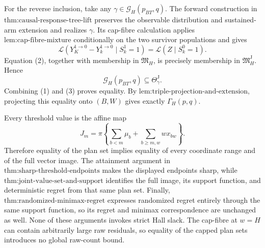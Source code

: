 For the reverse inclusion, take any \(\gamma\in\mathcal G_H(p_{BT},q)\). The forward construction in \(\text{thm:causal-response-tree-lift}\) preserves the observable distribution and sustained-arm extension and realizes \(\gamma\). Its cap-fibre calculation applies \(\text{lem:cap-fibre-mixture}\) conditionally on the two survivor populations and gives
\[
 \mathcal L(Y_K^{1\to0}-Y_k^{1\to0}\mid S_k^1=1)
 =\mathcal L(Z\mid S_k^0=1).                              \tag{2}
\]
Equation (2), together with membership in \(\mathfrak M_H\), is precisely membership in \(\mathfrak M_H^{\mathrm J}\). Hence
\[
 \mathcal G_H(p_{BT},q)\subseteq\Theta_{\gamma}^{\mathrm J}. \tag{3}
\]
Combining (1) and (3) proves equality. By \(\text{lem:triple-projection-and-extension}\), projecting this equality onto \((B,W)\) gives exactly \(\Gamma_H(p,q)\).

Every threshold value is the affine map
\[
 J_m=\pi\left\{\sum_{b<m}\mu_b+
                  \sum_{b\ge m,w}wx_{bw}\right\}.       \tag{4}
\]
Therefore equality of the plan set implies equality of every coordinate range and of the full vector image. The attainment argument in \(\text{thm:sharp-threshold-endpoints}\) makes the displayed endpoints sharp, while \(\text{thm:joint-value-set-and-support}\) identifies the full image, its support function, and deterministic regret from that same plan set. Finally, \(\text{thm:randomized-minimax-regret}\) expresses randomized regret entirely through the same support function, so its regret and minimax correspondence are unchanged as well. None of these arguments invokes strict Hall slack. The cap-fibre at \(w=H\) can contain arbitrarily large raw residuals, so equality of the capped plan sets introduces no global raw-count bound.
